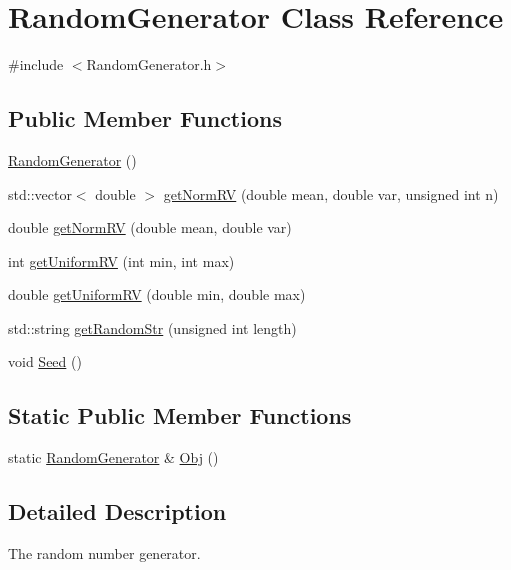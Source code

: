 \hypertarget{classRandomGenerator}{}\section{Random\+Generator Class Reference}
\label{classRandomGenerator}


{\ttfamily \#include $<$Random\+Generator.\+h$>$}

\subsection*{Public Member Functions}
\begin{DoxyCompactItemize}
\item 
\hyperlink{classRandomGenerator_ad2b3256e634878160c7d8b6e865341b2}{Random\+Generator} ()
\item 
std\+::vector$<$ double $>$ \hyperlink{classRandomGenerator_a6a5e536f784814c4fcd596fcc911d14a}{get\+Norm\+R\+V} (double mean, double var, unsigned int n)
\item 
double \hyperlink{classRandomGenerator_a96a04ffa03a3f0a3e95d50d7c7e828cb}{get\+Norm\+R\+V} (double mean, double var)
\item 
int \hyperlink{classRandomGenerator_a39a6365864741e8246546162b6e5a34e}{get\+Uniform\+R\+V} (int min, int max)
\item 
double \hyperlink{classRandomGenerator_ad584ae9751a4cd03b981ced9c12f4e6e}{get\+Uniform\+R\+V} (double min, double max)
\item 
std\+::string \hyperlink{classRandomGenerator_a2da3e84fb399d8af423547376a1aae42}{get\+Random\+Str} (unsigned int length)
\item 
void \hyperlink{classRandomGenerator_a35e84fa76d2bfaba05671aa0f79c1b0a}{Seed} ()
\end{DoxyCompactItemize}
\subsection*{Static Public Member Functions}
\begin{DoxyCompactItemize}
\item 
static \hyperlink{classRandomGenerator}{Random\+Generator} \& \hyperlink{classRandomGenerator_a6c161d5ba97abe160d46d031f2211eb7}{Obj} ()
\end{DoxyCompactItemize}


\subsection{Detailed Description}
The random number generator. 

